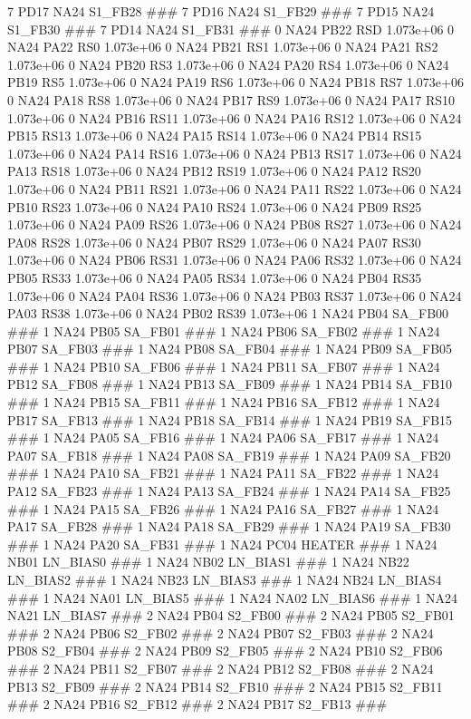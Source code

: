 7 PD17 NA24 S1_FB28 ### 
7 PD16 NA24 S1_FB29 ### 
7 PD15 NA24 S1_FB30 ### 
7 PD14 NA24 S1_FB31 ### 
0 NA24 PB22 RSD 1.073e+06 
0 NA24 PA22 RS0 1.073e+06 
0 NA24 PB21 RS1 1.073e+06 
0 NA24 PA21 RS2 1.073e+06 
0 NA24 PB20 RS3 1.073e+06 
0 NA24 PA20 RS4 1.073e+06 
0 NA24 PB19 RS5 1.073e+06 
0 NA24 PA19 RS6 1.073e+06 
0 NA24 PB18 RS7 1.073e+06 
0 NA24 PA18 RS8 1.073e+06 
0 NA24 PB17 RS9 1.073e+06 
0 NA24 PA17 RS10 1.073e+06 
0 NA24 PB16 RS11 1.073e+06 
0 NA24 PA16 RS12 1.073e+06 
0 NA24 PB15 RS13 1.073e+06 
0 NA24 PA15 RS14 1.073e+06 
0 NA24 PB14 RS15 1.073e+06 
0 NA24 PA14 RS16 1.073e+06 
0 NA24 PB13 RS17 1.073e+06 
0 NA24 PA13 RS18 1.073e+06 
0 NA24 PB12 RS19 1.073e+06 
0 NA24 PA12 RS20 1.073e+06 
0 NA24 PB11 RS21 1.073e+06 
0 NA24 PA11 RS22 1.073e+06 
0 NA24 PB10 RS23 1.073e+06 
0 NA24 PA10 RS24 1.073e+06 
0 NA24 PB09 RS25 1.073e+06 
0 NA24 PA09 RS26 1.073e+06 
0 NA24 PB08 RS27 1.073e+06 
0 NA24 PA08 RS28 1.073e+06 
0 NA24 PB07 RS29 1.073e+06 
0 NA24 PA07 RS30 1.073e+06 
0 NA24 PB06 RS31 1.073e+06 
0 NA24 PA06 RS32 1.073e+06 
0 NA24 PB05 RS33 1.073e+06 
0 NA24 PA05 RS34 1.073e+06 
0 NA24 PB04 RS35 1.073e+06 
0 NA24 PA04 RS36 1.073e+06 
0 NA24 PB03 RS37 1.073e+06 
0 NA24 PA03 RS38 1.073e+06 
0 NA24 PB02 RS39 1.073e+06 
1 NA24 PB04 SA_FB00 ### 
1 NA24 PB05 SA_FB01 ### 
1 NA24 PB06 SA_FB02 ### 
1 NA24 PB07 SA_FB03 ### 
1 NA24 PB08 SA_FB04 ### 
1 NA24 PB09 SA_FB05 ### 
1 NA24 PB10 SA_FB06 ### 
1 NA24 PB11 SA_FB07 ### 
1 NA24 PB12 SA_FB08 ### 
1 NA24 PB13 SA_FB09 ### 
1 NA24 PB14 SA_FB10 ### 
1 NA24 PB15 SA_FB11 ### 
1 NA24 PB16 SA_FB12 ### 
1 NA24 PB17 SA_FB13 ### 
1 NA24 PB18 SA_FB14 ### 
1 NA24 PB19 SA_FB15 ### 
1 NA24 PA05 SA_FB16 ### 
1 NA24 PA06 SA_FB17 ### 
1 NA24 PA07 SA_FB18 ### 
1 NA24 PA08 SA_FB19 ### 
1 NA24 PA09 SA_FB20 ### 
1 NA24 PA10 SA_FB21 ### 
1 NA24 PA11 SA_FB22 ### 
1 NA24 PA12 SA_FB23 ### 
1 NA24 PA13 SA_FB24 ### 
1 NA24 PA14 SA_FB25 ### 
1 NA24 PA15 SA_FB26 ### 
1 NA24 PA16 SA_FB27 ### 
1 NA24 PA17 SA_FB28 ### 
1 NA24 PA18 SA_FB29 ### 
1 NA24 PA19 SA_FB30 ### 
1 NA24 PA20 SA_FB31 ### 
1 NA24 PC04 HEATER ### 
1 NA24 NB01 LN_BIAS0 ### 
1 NA24 NB02 LN_BIAS1 ### 
1 NA24 NB22 LN_BIAS2 ### 
1 NA24 NB23 LN_BIAS3 ### 
1 NA24 NB24 LN_BIAS4 ### 
1 NA24 NA01 LN_BIAS5 ### 
1 NA24 NA02 LN_BIAS6 ### 
1 NA24 NA21 LN_BIAS7 ### 
2 NA24 PB04 S2_FB00 ### 
2 NA24 PB05 S2_FB01 ### 
2 NA24 PB06 S2_FB02 ### 
2 NA24 PB07 S2_FB03 ### 
2 NA24 PB08 S2_FB04 ### 
2 NA24 PB09 S2_FB05 ### 
2 NA24 PB10 S2_FB06 ### 
2 NA24 PB11 S2_FB07 ### 
2 NA24 PB12 S2_FB08 ### 
2 NA24 PB13 S2_FB09 ### 
2 NA24 PB14 S2_FB10 ### 
2 NA24 PB15 S2_FB11 ### 
2 NA24 PB16 S2_FB12 ### 
2 NA24 PB17 S2_FB13 ### 
